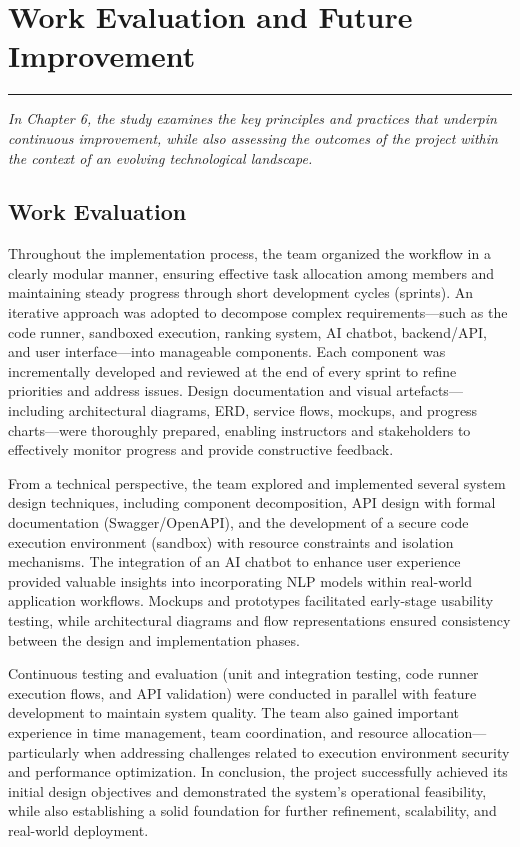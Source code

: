 \chapter {Work Evaluation and Future Improvement}
\noindent
\rule{\textwidth}{0.4pt}

\begin{center}
\begin{minipage}{0.8\textwidth}
\textit{In Chapter 6, the study examines the key principles and practices that underpin continuous improvement, while also assessing the outcomes of the project within the context of an evolving technological landscape.}
\end{minipage}
\end{center}

\section{Work Evaluation}

Throughout the implementation process, the team organized the workflow in a clearly modular manner, ensuring effective task allocation among members and maintaining steady progress through short development cycles (sprints). An iterative approach was adopted to decompose complex requirements—such as the code runner, sandboxed execution, ranking system, AI chatbot, backend/API, and user interface—into manageable components. Each component was incrementally developed and reviewed at the end of every sprint to refine priorities and address issues. Design documentation and visual artefacts—including architectural diagrams, ERD, service flows, mockups, and progress charts—were thoroughly prepared, enabling instructors and stakeholders to effectively monitor progress and provide constructive feedback.

From a technical perspective, the team explored and implemented several system design techniques, including component decomposition, API design with formal documentation (Swagger/OpenAPI), and the development of a secure code execution environment (sandbox) with resource constraints and isolation mechanisms. The integration of an AI chatbot to enhance user experience provided valuable insights into incorporating NLP models within real-world application workflows. Mockups and prototypes facilitated early-stage usability testing, while architectural diagrams and flow representations ensured consistency between the design and implementation phases.

Continuous testing and evaluation (unit and integration testing, code runner execution flows, and API validation) were conducted in parallel with feature development to maintain system quality. The team also gained important experience in time management, team coordination, and resource allocation—particularly when addressing challenges related to execution environment security and performance optimization. In conclusion, the project successfully achieved its initial design objectives and demonstrated the system’s operational feasibility, while also establishing a solid foundation for further refinement, scalability, and real-world deployment.

